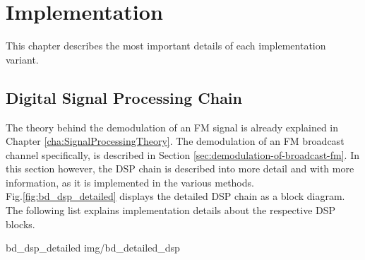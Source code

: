 \chapter{Implementation}
\label{cha:Implementation}

This chapter describes the most important details of each implementation variant.

\section{Digital Signal Processing Chain}

The theory behind the demodulation of an FM signal is already explained in Chapter \ref{cha:SignalProcessingTheory}.
The demodulation of an FM broadcast channel specifically, is described in Section \ref{sec:demodulation-of-broadcast-fm}.
In this section however, the DSP chain is described into more detail and with more information, as it is implemented in the various methods.\\

Fig.\ref{fig:bd_dsp_detailed} displays the detailed DSP chain as a block diagram. The following list explains implementation details about the respective DSP blocks.

 {bd_dsp_detailed} {img/bd_detailed_dsp}

